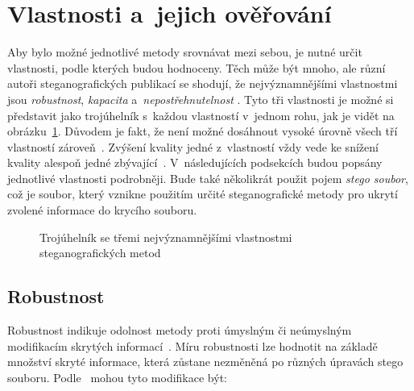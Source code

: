 \section{Vlastnosti a~jejich ověřování}
\label{sec:method-properties}

Aby bylo možné jednotlivé metody srovnávat mezi sebou, je nutné určit
vlastnosti, podle kterých budou hodnoceny. Těch může být mnoho, ale různí
autoři steganografických publikací se shodují, že nejvýznamnějšími vlastnostmi
jsou \textit{robustnost}, \textit{kapacita} a~\textit{nepostřehnutelnost}
\cite{AlSabhany2020}\cite{Djebbar2012}\cite{Dutta2020}. Tyto tři vlastnosti je
možné si představit jako trojúhelník s~každou vlastností v~jednom rohu, jak je
vidět na obrázku~\ref{pic:method-property-triangle}. Důvodem je fakt, že není
možné dosáhnout vysoké úrovně všech tří vlastností zároveň~\cite{Dutta2020}.
Zvýšení kvality jedné z~vlastností vždy vede ke snížení kvality alespoň jedné
zbývající~\cite{AlSabhany2020}\cite{Djebbar2012}. V~následujících podsekcích
budou popsány jednotlivé vlastnosti podrobněji. Bude také několikrát použit
pojem \textit{stego soubor}, což je soubor, který vznikne použitím určité
steganografické metody pro ukrytí zvolené informace do krycího souboru.

\begin{figure}[hbt]
    \centering
    \caption{Trojúhelník se třemi nejvýznamnějšími vlastnostmi
    steganografických metod}
    \label{pic:method-property-triangle}
\end{figure}

\subsection*{Robustnost}
\label{sub:robustness}

Robustnost indikuje odolnost metody proti úmyslným či neúmyslným modifikacím
skrytých informací~\cite{AlSabhany2020}\cite{Dutta2020}. Míru robustnosti lze
hodnotit na základě množství skryté informace, která zůstane nezměněná po
různých úpravách stego souboru. Podle~\cite{Djebbar2012} mohou tyto modifikace
být:

